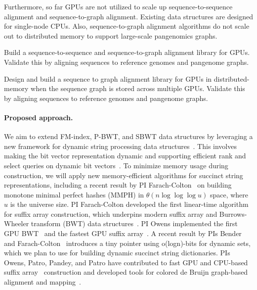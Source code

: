 
Furthermore, so far GPUs are not utilized to scale up sequence-to-sequence alignment and sequence-to-graph alignment. Existing data structures are designed for single-node CPUs. Also, sequence-to-graph alignment algorithms do not scale out to distributed memory to support large-scale pangenomics graphs. 

\begin{rproblem}
Build a sequence-to-sequence and sequence-to-graph alignment library for GPUs. Validate this by aligning sequences to reference genomes and pangenome graphs.
\end{rproblem}

\begin{rproblem}
Design and build a sequence to graph alignment library for GPUs in distributed-memory when the sequence graph is stored across multiple GPUs. Validate this by aligning sequences to reference genomes and pangenome graphs.
\end{rproblem}

\paragraph{Proposed approach.} 
We aim to extend FM-index, P-BWT, and SBWT data structures by leveraging a new framework for dynamic string processing data structures~\cite{Nicola17,Farzan2011}. This involves making the bit vector representation dynamic and supporting efficient rank and select queries on dynamic bit vectors~\cite{Raman2001}. To minimize memory usage during construction, we will apply new memory-efficient algorithms for succinct string representations, including a recent result by PI Farach-Colton~\cite{Assadi2023} on building monotone minimal perfect hashes (MMPH) in $\theta(n \log{\log{\log u}})$ space, where $u$ is the universe size.
%
PI Farach-Colton developed the first linear-time algorithm for suffix array construction, which underpins modern suffix array and Burrows-Wheeler transform (BWT) data structures~\cite{Farach97,Ambainis97}. PI Owens implemented the first GPU BWT~\cite{Patel:2012:PLD} and the fastest GPU suffix array~\cite{Wang:2016:FPS}. A recent result by PIs Bender and Farach-Colton~\cite{Bender2023} introduces a tiny pointer using o(logn)-bits for dynamic sets, which we plan to use for building dynamic succinct string dictionaries. PIs Owens, Patro, Pandey, and Patro have contributed to fast GPU and CPU-based suffix array~\cite{Khan2023CapsSA} construction and developed tools for colored de Bruijn graph-based alignment and mapping~\cite{Almodaresi2018Pufferfish,Almodaresi2021,fan2023fulgor,Pibiri2023MacDBG,he2022alevin}.

